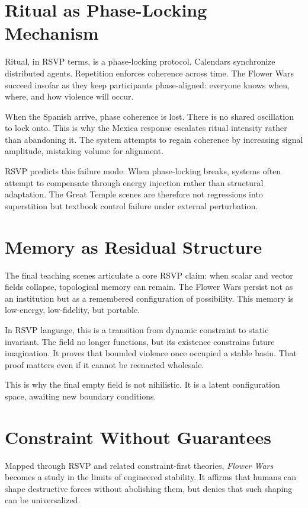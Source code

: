 \documentclass[12pt]{article}
\begin{document}
\section*{Ritual as Phase-Locking Mechanism}

Ritual, in RSVP terms, is a phase-locking protocol. Calendars synchronize distributed agents. Repetition enforces coherence across time. The Flower Wars succeed insofar as they keep participants phase-aligned: everyone knows when, where, and how violence will occur.

When the Spanish arrive, phase coherence is lost. There is no shared oscillation to lock onto. This is why the Mexica response escalates ritual intensity rather than abandoning it. The system attempts to regain coherence by increasing signal amplitude, mistaking volume for alignment.

RSVP predicts this failure mode. When phase-locking breaks, systems often attempt to compensate through energy injection rather than structural adaptation. The Great Temple scenes are therefore not regressions into superstition but textbook control failure under external perturbation.

\section*{Memory as Residual Structure}

The final teaching scenes articulate a core RSVP claim: when scalar and vector fields collapse, topological memory can remain. The Flower Wars persist not as an institution but as a remembered configuration of possibility. This memory is low-energy, low-fidelity, but portable.

In RSVP language, this is a transition from dynamic constraint to static invariant. The field no longer functions, but its existence constrains future imagination. It proves that bounded violence once occupied a stable basin. That proof matters even if it cannot be reenacted wholesale.

This is why the final empty field is not nihilistic. It is a latent configuration space, awaiting new boundary conditions.

\section*{Constraint Without Guarantees}

Mapped through RSVP and related constraint-first theories, \textit{Flower Wars} becomes a study in the limits of engineered stability. It affirms that humans can shape destructive forces without abolishing them, but denies that such shaping can be universalized.
\end{document}
